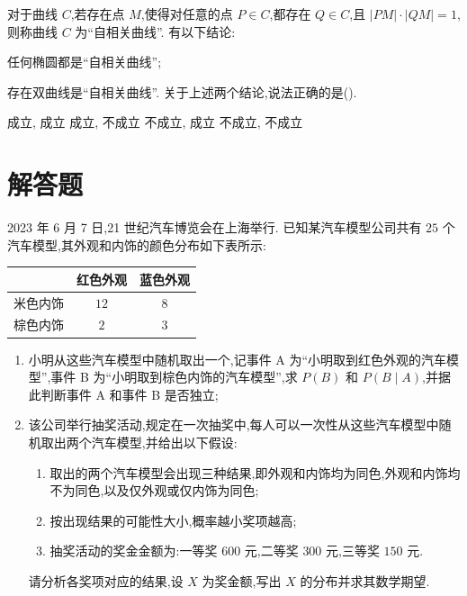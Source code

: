 \begin{problem}
对于曲线 \(C\),若存在点 \(M\),使得对任意的点 \(P\in C\),都存在 \(Q\in C\),且 \(\left|PM\right|\cdot\left|QM\right|=1\),则称曲线 \(C\) 为``自相关曲线''. 有以下结论:
\begin{circlelist}
\item 任何椭圆都是``自相关曲线'';
\item 存在双曲线是``自相关曲线''. 关于上述两个结论,说法正确的是(\quad).
\end{circlelist}

\choices
    { 成立, 成立}
    { 成立, 不成立}
    { 不成立, 成立}
    { 不成立, 不成立}
\end{problem}

\section{解答题}

\begin{problem}
2023 年 6 月 7 日,21 世纪汽车博览会在上海举行. 已知某汽车模型公司共有 \(25\) 个汽车模型,其外观和内饰的颜色分布如下表所示:

\begin{center}
\begin{tabular}{c|cc}
\hline
& 红色外观 & 蓝色外观\\
\hline
米色内饰 & \(12\) & \(8\)\\
棕色内饰 & \(2\) & \(3\)\\
\hline
\end{tabular}
\end{center}

\begin{enumerate}
\item 小明从这些汽车模型中随机取出一个,记事件 A 为``小明取到红色外观的汽车模型'',事件 B 为``小明取到棕色内饰的汽车模型'',求 \(P(B)\) 和 \(P(B\mid A)\),并据此判断事件 A 和事件 B 是否独立;
\item 该公司举行抽奖活动,规定在一次抽奖中,每人可以一次性从这些汽车模型中随机取出两个汽车模型,并给出以下假设:
\begin{enumerate}
\item 取出的两个汽车模型会出现三种结果,即外观和内饰均为同色,外观和内饰均不为同色,以及仅外观或仅内饰为同色;
\item 按出现结果的可能性大小,概率越小奖项越高;
\item 抽奖活动的奖金金额为:一等奖 \(600\) 元,二等奖 \(300\) 元,三等奖 \(150\) 元.
\end{enumerate}
请分析各奖项对应的结果,设 \(X\) 为奖金额,写出 \(X\) 的分布并求其数学期望.
\end{enumerate}
\end{problem}

